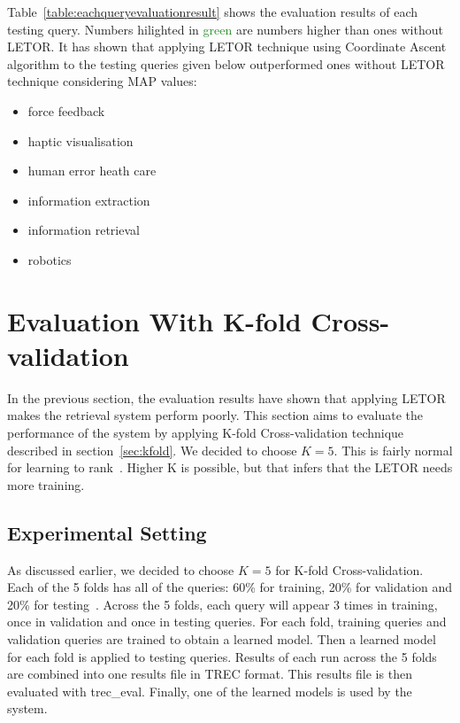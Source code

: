 Table~\ref{table:eachqueryevaluationresult} shows the evaluation results of each testing query. Numbers hilighted in \textcolor{ForestGreen}{green}
are numbers higher than ones without LETOR. It has shown that applying LETOR technique using
Coordinate Ascent algorithm to the testing queries given below outperformed ones without LETOR technique considering MAP values:
\begin{itemize}
 \item force feedback
 \item haptic visualisation
 \item human error heath care
 \item information extraction
 \item information retrieval
 \item robotics
\end{itemize}

\section{Evaluation With K-fold Cross-validation}
In the previous section, the evaluation results have shown that applying LETOR makes the retrieval system perform poorly. 
This section aims to evaluate the performance of the system by applying K-fold Cross-validation
technique described in section~\ref{sec:kfold}. We decided to choose $K = 5$. This is fairly normal for learning to rank~\cite{craig}.
Higher K is possible, but that infers that the LETOR needs more training.


\subsection{Experimental Setting}
As discussed earlier, we decided to choose $K = 5$ for K-fold Cross-validation. Each of the 5 folds has all of the queries: 60\% for training, 
20\% for validation and 20\% for testing~\cite{kfoldcv}. Across the 5 folds, each query will appear 3 times in training, once in validation and 
once in testing queries. For each fold, training queries and validation queries are trained to obtain a learned model.
Then a learned model for each fold is applied to testing queries. Results of each run across the 5 folds are combined into one results file in
TREC format. This results file is then evaluated with trec\_eval. Finally, one of the learned models is used by the system.

